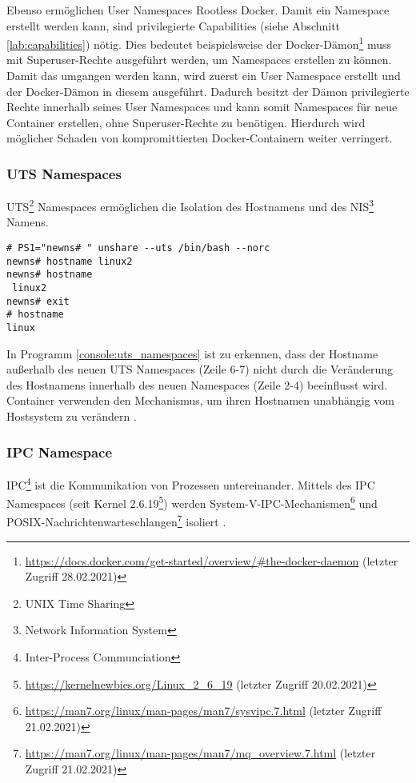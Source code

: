 Ebenso ermöglichen User Namespaces Rootless Docker\cite{docker_rootless}. Damit
ein Namespace erstellt werden kann, sind privilegierte Capabilities (siehe
Abschnitt \ref{lab:capabilities}) nötig. Dies bedeutet beispielsweise der
Docker-Dämon\footnote{\url{https://docs.docker.com/get-started/overview/\#the-docker-daemon}
(letzter Zugriff 28.02.2021)} muss mit Superuser-Rechte ausgeführt werden, um
Namespaces erstellen zu können. Damit das umgangen werden kann, wird zuerst ein
User Namespace erstellt und der Docker-Dämon in diesem ausgeführt. Dadurch
besitzt der Dämon privilegierte Rechte innerhalb seines User Namespaces und
kann somit Namespaces für neue Container erstellen, ohne Superuser-Rechte 
zu benötigen.
Hierdurch wird möglicher Schaden von kompromittierten Docker-Containern weiter
verringert.

\subsubsection{UTS Namespaces}
UTS\footnote{UNIX Time Sharing} Namespaces ermöglichen die Isolation des
Hostnamens und des NIS\footnote{Network Information System} Namens.

\begin{lstlisting}[label={console:uts_namespaces},caption={Beispiel für UTS Namespace}]
# PS1="newns# " unshare --uts /bin/bash --norc
newns# hostname linux2
newns# hostname
 linux2
newns# exit
# hostname
linux
\end{lstlisting}

In Programm \ref{console:uts_namespaces}  ist zu erkennen, dass der Hostname
au{\ss}erhalb des neuen UTS \linebreak Namespaces (Zeile 6-7) nicht durch die
Veränderung des Hostnamens innerhalb des neuen Namespaces (Zeile 2-4)
beeinflusst wird. Container verwenden den Mechanismus, um ihren Hostnamen
unabhängig vom Hostsystem zu verändern \cite{dockerutsnamespaces}.

\subsubsection{IPC Namespace}
IPC\footnote{Inter-Process Communciation} ist die Kommunikation von Prozessen
untereinander. Mittels des IPC Namespaces (seit Kernel
2.6.19\footnote{\url{https://kernelnewbies.org/Linux_2_6_19} (letzter Zugriff
20.02.2021)}) werden
System-V-IPC-Mechanismen\footnote{\url{https://man7.org/linux/man-pages/man7/sysvipc.7.html}
(letzter Zugriff 21.02.2021)} und
POSIX-Nachrichten\-warteschlangen\footnote{\url{https://man7.org/linux/man-pages/man7/mq_overview.7.html}
(letzter Zugriff 21.02.2021)} isoliert \cite{man_ipc_namespace}. 


